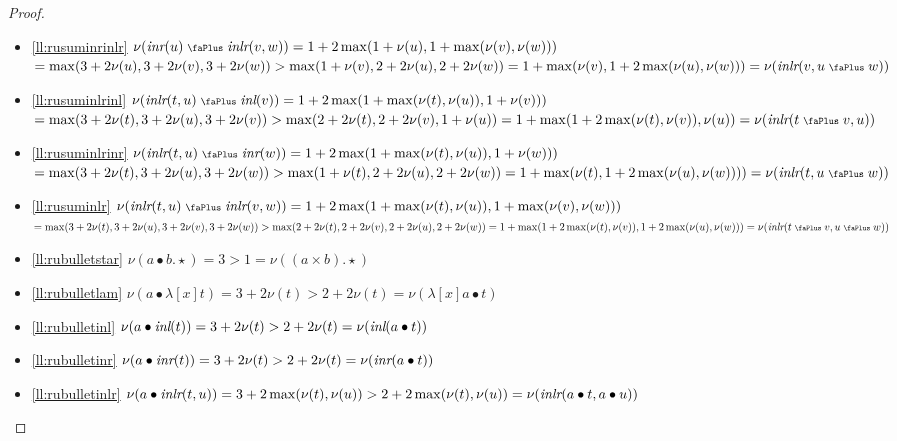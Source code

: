 \documentclass[screen, sigconf,authorversion,nonacm]{acmart}
\theoremstyle{acmdefinition}
\numberwithin{equation}{section}
\newcommand\abstr[1]{[#1]}
\newcommand\inl{\mbox{\it inl}}
\newcommand\inr{\mbox{\it inr}}
\newcommand\inlr{\mbox{\it inlr}}
\newcommand\plus{\mathrel{\text{\normalfont\scalebox{0.7}{\faPlus}}}}
\begin{document}
\begin{proof}
\begin{itemize}
  \item \eqref{ll:rusuminrinlr} $\nu(\inr(u) \plus \inlr(v,w)) = 1 +2
    \max (1 + \nu(u), 1 + \max(\nu(v),\nu(w)))$\\ $ = \max (3 + 2
    \nu(u), 3 + 2 \nu(v), 3 + 2 \nu(w)) > \max(1 + \nu(v),2 + 2 \nu(u),
    2 + 2 \nu(w)) = 1 + \max(\nu(v), 1 + 2 \max(\nu(u), \nu(w))) =
    \nu(\inlr(v,u \plus w))$

  \item \eqref{ll:rusuminlrinl} $\nu(\inlr(t,u) \plus \inl(v)) = 1 +2
  \max (1 + \max(\nu(t),\nu(u)), 1 + \nu(v)))$\\ $ = \max(3 + 2
  \nu(t),3 + 2 \nu(u),3 + 2 \nu(v)) > \max(2 + 2 \nu(t),2 + 2 \nu(v),
  1 + \nu(u)) = 1 + \max(1+ 2 \max(\nu(t),\nu(v)), \nu(u)) =
  \nu(\inlr(t \plus v,u))$

\item \eqref{ll:rusuminlrinr} $\nu(\inlr(t,u) \plus \inr(w)) = 1 +2 \max (1
+ \max(\nu(t),\nu(u)), 1 + \nu(w)))$\\ $ = \max(3 + 2 \nu(t),3 + 2
\nu(u),3 + 2 \nu(w)) > \max(1 + \nu(t),2 + 2 \nu(u), 2 + 2 \nu(w)) =
 1 + \max(\nu(t), 1+ 2 \max(\nu(u),\nu(w)))) = \nu(\inlr(t, u \plus
 w))$

\item \eqref{ll:rusuminlr} $\nu(\inlr(t,u) \plus \inlr(v,w)) = 1 +2
  \max (1 + \max(\nu(t),\nu(u)), 1 + \max(\nu(v),\nu(w)))$\\ $ =
  \max(3 + 2 \nu(t), 3 + 2 \nu(u),3 + 2 \nu(v), 3 + 2 \nu(w)) > \max(2
  + 2 \nu(t),2 + 2 \nu(v),2 + 2 \nu(u), 2 + 2 \nu(w)) = 1 + \max(1+ 2
  \max(\nu(t),\nu(v)), 1 + 2 \max(\nu(u),\nu(w))) = \nu(\inlr(t \plus
  v,u \plus w))$

\item \eqref{ll:rubulletstar} $\nu(a \bullet b.\star) = 3 > 1 = \nu((a
  \times b).\star)$

\item \eqref{ll:rubulletlam} $\nu(a \bullet \lambda \abstr{x} t) = 3 +
  2 \nu(t) > 2 + 2 \nu(t) = \nu(\lambda \abstr{x} a \bullet t)$

\item \eqref{ll:rubulletinl} $\nu(a \bullet \inl(t)) = 3 + 2 \nu(t) >
  2 + 2 \nu(t) = \nu(\inl(a \bullet t))$

\item \eqref{ll:rubulletinr} $\nu(a \bullet \inr(t)) = 3 + 2 \nu(t) >
  2 + 2 \nu(t) = \nu(\inr(a \bullet t))$

\item \eqref{ll:rubulletinlr} $\nu(a \bullet \inlr(t,u)) = 3 + 2
  \max(\nu(t),\nu(u)) > 2 + 2 \max(\nu(t),\nu(u)) = \nu(\inlr(a
  \bullet t,a \bullet u))$ \qedhere
  \end{itemize} 
\end{proof}
\end{document}
